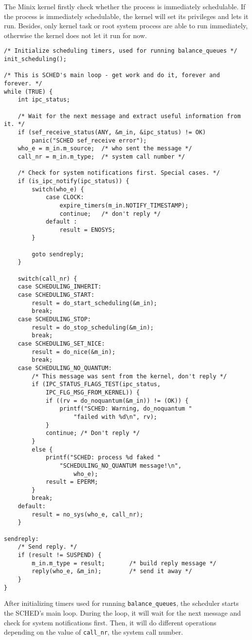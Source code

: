 \documentclass[a4paper]{article}
\begin{document}
The Minix kernel firstly check whether the process is immediately schedulable. If the process is immediately schedulable, the kernel will set its privileges and lets it run. Besides, only kernel task or root system process are able to run immediately, otherwise the kernel does not let it run for now.
\begin{verbatim}
/* Initialize scheduling timers, used for running balance_queues */
init_scheduling();

/* This is SCHED's main loop - get work and do it, forever and forever. */
while (TRUE) {
    int ipc_status;

    /* Wait for the next message and extract useful information from it. */
    if (sef_receive_status(ANY, &m_in, &ipc_status) != OK)
        panic("SCHED sef_receive error");
    who_e = m_in.m_source;	/* who sent the message */
    call_nr = m_in.m_type;	/* system call number */

    /* Check for system notifications first. Special cases. */
    if (is_ipc_notify(ipc_status)) {
        switch(who_e) {
            case CLOCK:
                expire_timers(m_in.NOTIFY_TIMESTAMP);
                continue;	/* don't reply */
            default :
                result = ENOSYS;
        }

        goto sendreply;
    }

    switch(call_nr) {
    case SCHEDULING_INHERIT:
    case SCHEDULING_START:
        result = do_start_scheduling(&m_in);
        break;
    case SCHEDULING_STOP:
        result = do_stop_scheduling(&m_in);
        break;
    case SCHEDULING_SET_NICE:
        result = do_nice(&m_in);
        break;
    case SCHEDULING_NO_QUANTUM:
        /* This message was sent from the kernel, don't reply */
        if (IPC_STATUS_FLAGS_TEST(ipc_status,
            IPC_FLG_MSG_FROM_KERNEL)) {
            if ((rv = do_noquantum(&m_in)) != (OK)) {
                printf("SCHED: Warning, do_noquantum "
                    "failed with %d\n", rv);
            }
            continue; /* Don't reply */
        }
        else {
            printf("SCHED: process %d faked "
                "SCHEDULING_NO_QUANTUM message!\n",
                    who_e);
            result = EPERM;
        }
        break;
    default:
        result = no_sys(who_e, call_nr);
    }

sendreply:
    /* Send reply. */
    if (result != SUSPEND) {
    	m_in.m_type = result;  		/* build reply message */
    	reply(who_e, &m_in);		/* send it away */
    }
}
\end{verbatim}
After initializing timers used for running \texttt{balance\_queues}, the scheduler starts the SCHED's main loop. During the loop, it will wait for the next message and check for system notifications first. Then, it will do different operations depending on the value of \texttt{call\_nr}, the system call number.
\end{document}
